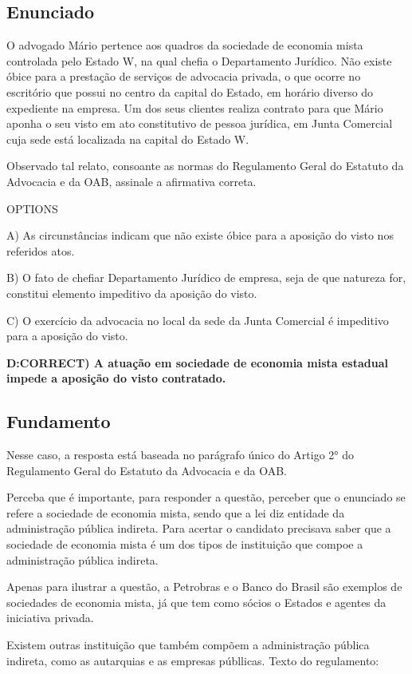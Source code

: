 \documentclass[12pt]{article}
\begin{document}
\subsection{Enunciado}

O advogado Mário pertence aos quadros da sociedade de 
economia mista controlada pelo Estado W, na qual chefia o 
Departamento Jurídico. Não existe óbice para a prestação de 
serviços de advocacia privada, o que ocorre no escritório que 
possui no centro da capital do Estado, em horário diverso do 
expediente na empresa. Um dos seus clientes realiza contrato 
para que Mário aponha o seu visto em ato constitutivo de 
pessoa jurídica, em Junta Comercial cuja sede está localizada 
na capital do Estado W.  
 
Observado tal relato, consoante as normas do Regulamento 
Geral do Estatuto da Advocacia e da OAB, assinale a afirmativa 
correta. 
 
OPTIONS

A) As circunstâncias indicam que não existe óbice para a 
aposição do visto nos referidos atos. 

B) O fato de chefiar Departamento Jurídico de empresa, seja 
de que natureza for, constitui elemento impeditivo da 
aposição do visto. 

C) O exercício da advocacia no local da sede da Junta 
Comercial é impeditivo para a aposição do visto. 

\textbf{D:CORRECT) A atuação em sociedade de economia mista estadual 
impede a aposição do visto contratado. }

\subsection{Fundamento}

Nesse caso, a resposta está baseada no parágrafo único do Artigo 2° do Regulamento Geral do Estatuto da Advocacia e da OAB.

Perceba que é importante, para responder a questão, perceber que o enunciado se refere a sociedade de economia mista, sendo que a lei diz entidade da administração pública indireta. Para acertar o candidato precisava saber que a sociedade de economia mista é um dos tipos de instituição que compoe a administração pública indireta.

Apenas para ilustrar a questão, a Petrobras e o Banco do Brasil são exemplos de sociedades de economia mista, já que tem como sócios o Estados e agentes da iniciativa privada.

Existem outras instituição que também compõem a administração pública indireta, como as autarquias e as empresas públlicas. Texto do regulamento:
\end{document}
